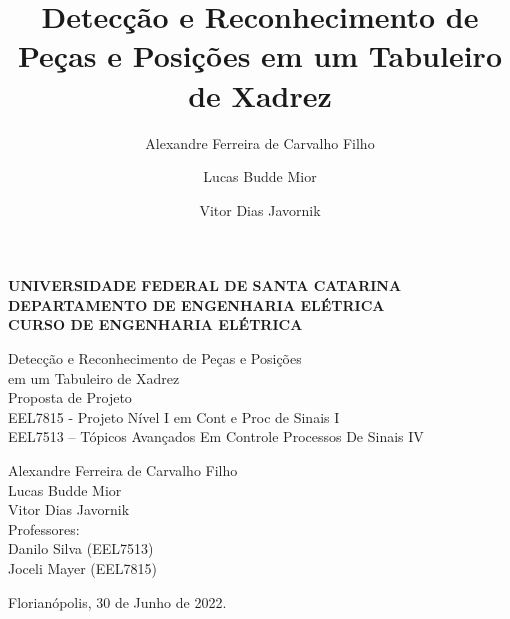 \documentclass[a4paper,12pt,twoside]{article}
\title{Detecção e Reconhecimento de Peças e Posições em um Tabuleiro de Xadrez}
\author{Alexandre Ferreira de Carvalho Filho}
\author{Lucas Budde Mior}
\author{Vitor Dias Javornik}
\newenvironment{boldenv}
{\bfseries}
{}
\begin{document}
\begin{titlepage}
    \large
    \begin{center}
        \begin{boldenv}
            UNIVERSIDADE FEDERAL DE SANTA CATARINA \\
            DEPARTAMENTO DE ENGENHARIA ELÉTRICA \\
            CURSO DE ENGENHARIA ELÉTRICA \\
            \vspace*{2cm}

            \vspace*{\fill}
            Detecção e Reconhecimento de Peças e Posições \\
            em um Tabuleiro de Xadrez \\
            \vspace*{1cm}
            Proposta de Projeto \\
            \vspace*{1cm}
            EEL7815 - Projeto Nível I em Cont e Proc de Sinais I \\
            EEL7513 – Tópicos Avançados Em Controle Processos De Sinais IV
            \vspace*{\fill}

            Alexandre Ferreira de Carvalho Filho \\
            Lucas Budde Mior \\
            Vitor Dias Javornik \\
            \vspace{0.5cm}
            Professores: \\
            Danilo Silva (EEL7513) \\
            Joceli Mayer (EEL7815)

            \vfill

            Florianópolis, 30 de Junho de 2022.
        \end{boldenv}
    \end{center}
\end{titlepage}
\renewcommand{\contentsname}{Sumário}

\pagestyle{empty}
\tableofcontents
\newpage

\end{document}
